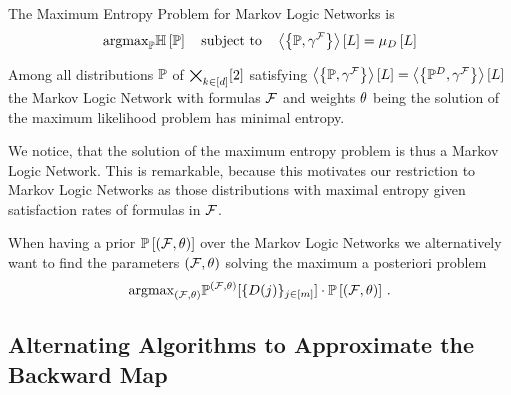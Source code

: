 The Maximum Entropy Problem for Markov Logic Networks is
\begin{align}
	\argmax_{\probtensor} \sentropyof{\probtensor} 
	\quad \text{subject to} \quad  
	\sbcontractionof{\probtensor,\sencodingof{\formulaset}}{\selvariable}
	 =  \datameanat{\selvariable} %
\end{align}


\begin{corollary}
	Among all distributions $\mathbb{P}$ of $\bigtimes_{k\in[d]}[2]$ satisfying $\left\langle \left\{\mathbb{P},\gamma^{\mathcal{F}}\right\}\right\rangle \left[ L \right]
	 = \left\langle \left\{\mathbb{P}^{D},\gamma^{\mathcal{F}}\right\}\right\rangle \left[ L \right]$ the Markov Logic Network with formulas $\mathcal{F}$ and weights $\theta$ being the solution of the maximum likelihood problem has minimal entropy.
\end{corollary}

We notice, that the solution of the maximum entropy problem is thus a Markov Logic Network.
This is remarkable, because this motivates our restriction to Markov Logic Networks as those distributions with maximal entropy given satisfaction rates of formulas in $\mathcal{F}$.


When having a prior $\mathbb{P}\left[(\mathcal{F},\theta)\right]$ over the Markov Logic Networks we alternatively want to find the parameters $(\mathcal{F},\theta)$ solving the maximum a posteriori problem
\begin{align}
	\mathrm{argmax}_{(\mathcal{F},\theta)} \mathbb{P}^{(\mathcal{F},\theta)}[\{D(j)\}_{j\in[m]}]\cdot \mathbb{P}\left[(\mathcal{F},\theta)\right]\, . 
\end{align}




















\subsection{Alternating Algorithms to Approximate the Backward Map}\label{sec:alternatingParEstMLN}

